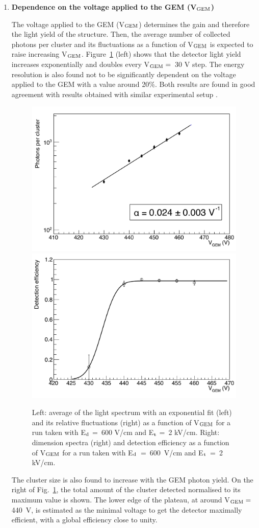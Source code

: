 \documentclass[a4paper]{jpconf}
\begin{document}
\begin{enumerate}
\item \textbf{Dependence on the voltage applied to the GEM (V$_{\rm GEM}$)}

The voltage applied to the GEM (V$_{\rm GEM}$) determines the gain and
therefore the light yield of the structure. Then, the average number
of collected photons per cluster and its fluctuations as a function of
V$_{\rm GEM}$ is expected to raise increasing V$_{\rm GEM}$.
Figure~\ref{fig:vgem1} (left) shows that the detector light yield
increases exponentially and doubles every V$_{\rm GEM} =$~30 V step.
The energy resolution is also found not to be significantly dependent
on the voltage applied to the GEM with a value around 20\%. Both
results are found in good agreement with results obtained with similar
experimental setup \cite{bib:loomba}.


\begin{figure}[htbp]
\centering
\includegraphics[width=.42\textwidth]{gPhotFar_Vg.pdf}
\includegraphics[width=.42\textwidth]{gEffFar_Vg.pdf}
\caption{Left: average of the light spectrum with an exponential fit
  (left) and its relative fluctuations (right) as a function of
  V$_{\rm GEM}$ for a run taken with E$_{\rm d}$ =~600 V/cm and
  E$_{\rm t}$ =~2 kV/cm. Right: dimension spectra (right) and
  detection efficiency as a function of V$_{\rm GEM}$ for a run taken
  with E$_{\rm d}$~=~600~V/cm and E$_{\rm t}$~=~2
  kV/cm. \label{fig:vgem1}}
\end{figure}

The cluster size is also found to increase with the GEM photon
yield. On the right of Fig.~\ref{fig:vgem1}, the total amount of the
cluster detected normalised to its maximum value is shown.  The lower
edge of the plateau, at around V$_{\rm GEM}=$ 440~V, is estimated as
the minimal voltage to get the detector maximally efficient, with a
global efficiency close to unity.


\end{enumerate}
\end{document}
